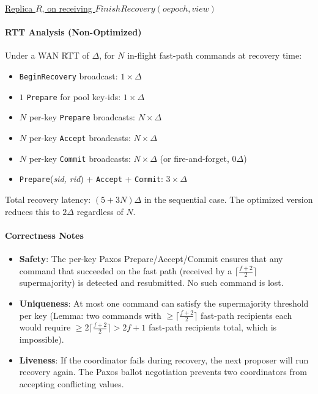 \documentclass[twocolumn]{article}
\begin{document}
\begin{algorithm}
\caption{Server -- $OnFinishRecovery$}
\label{alg:on_finish_recovery}
\setcounter{AlgoLine}{114}

\underline{Replica $R$, on receiving $FinishRecovery(oepoch, view)$}\\
\end{algorithm}


\paragraph{RTT Analysis (Non-Optimized)}
Under a WAN RTT of $\Delta$, for $N$ in-flight fast-path commands at recovery time:
\begin{itemize}
  \setlength{\itemsep}{0pt}
  \item \texttt{BeginRecovery} broadcast: $1 \times \Delta$
  \item $1$ \texttt{Prepare} for pool key-ids: $1 \times \Delta$
  \item $N$ per-key \texttt{Prepare} broadcasts: $N \times \Delta$
  \item $N$ per-key \texttt{Accept} broadcasts: $N \times \Delta$
  \item $N$ per-key \texttt{Commit} broadcasts: $N \times \Delta$ (or fire-and-forget, $0\Delta$)
  \item \texttt{Prepare}(\emph{sid, rid}) + \texttt{Accept} + \texttt{Commit}: $3 \times \Delta$
\end{itemize}
Total recovery latency: $(5 + 3N)\Delta$ in the sequential case. The optimized version reduces this to $2\Delta$ regardless of $N$.

\paragraph{Correctness Notes}
\begin{itemize}
  \setlength{\itemsep}{0pt}
  \item \textbf{Safety}: The per-key Paxos Prepare/Accept/Commit ensures that any command that succeeded on the fast path (received by a $\lceil\frac{f+2}{2}\rceil$ supermajority) is detected and resubmitted. No such command is lost.
  \item \textbf{Uniqueness}: At most one command can satisfy the supermajority threshold per key (Lemma: two commands with $\ge\lceil\frac{f+2}{2}\rceil$ fast-path recipients each would require $\ge 2\lceil\frac{f+2}{2}\rceil > 2f+1$ fast-path recipients total, which is impossible).
  \item \textbf{Liveness}: If the coordinator fails during recovery, the next proposer will run recovery again. The Paxos ballot negotiation prevents two coordinators from accepting conflicting values.
\end{itemize}
\end{document}
